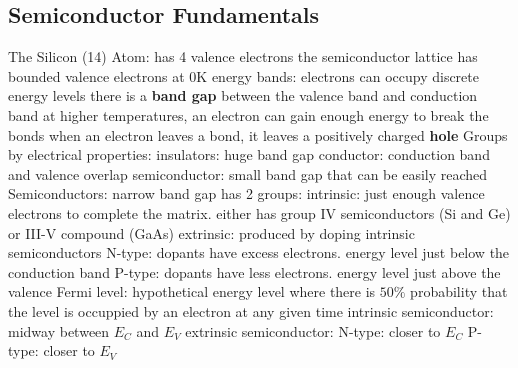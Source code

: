 \documentclass[a4paper,11pt]{article}
\begin{document}
	\subsection{Semiconductor Fundamentals}
	\begin{outline}[enumerate]
		\1 The Silicon (14) Atom: 	
			\2 has 4 valence electrons
			\2 the semiconductor lattice has bounded valence electrons at $0$K
			\2 energy bands: electrons can occupy discrete energy levels 
			\2 there is a \textbf{band gap} between the valence band and conduction band 
			\2 at higher temperatures, an electron can gain enough energy to break the bonds 
			\2 when an electron leaves a bond, it leaves a positively charged \textbf{hole}
		\1 Groups by electrical properties: 
			\2 insulators: huge band gap 
			\2 conductor: conduction band and valence overlap
			\2 semiconductor: small band gap that can be easily reached
		\1 Semiconductors: 
			\2 narrow band gap 
			\2 has 2 groups:
				\3 intrinsic: just enough valence electrons to complete the matrix.  either has group IV semiconductors (Si and Ge) or III-V compound (GaAs)		
				\3 extrinsic: produced by doping intrinsic semiconductors
					\4 N-type: dopants have excess electrons. energy level just below the conduction band
					\4 P-type: dopants have less electrons. energy level just above the valence 
		\1 Fermi level: hypothetical energy level where there is $50\%$ probability that the level is occuppied by an electron at any given time 			
			\2 intrinsic semiconductor: midway between $E_{C}$ and $E_{V}$
			\2 extrinsic semiconductor: 
				\3 N-type: closer to $E_{C}$
				\3 P-type: closer to $E_{V}$
	\end{outline}
\end{document}
